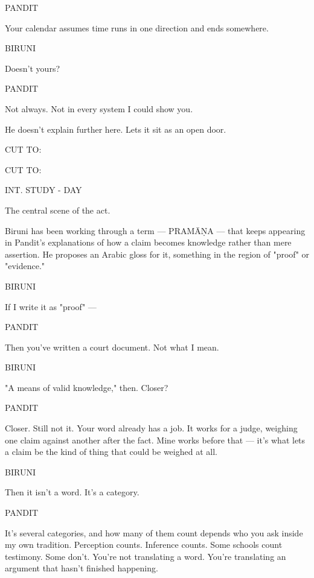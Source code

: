 \documentclass[12pt]{article}
\newcommand{\sceneheading}[1]{%
  \needspace{4\baselineskip}%
  \par\vspace{1\baselineskip}\noindent #1\par\vspace{0.6\baselineskip}%
}
\newcommand{\action}[1]{%
  \par\noindent #1\par\vspace{0.6\baselineskip}%
}
\newcommand{\transition}[1]{%
  \par\vspace{0.3\baselineskip}%
  \ifthenelse{\equal{#1}{FADE IN:}}%
    {\noindent #1\par}%
    {\noindent\hfill #1\par}%
  \vspace{0.6\baselineskip}%
}
\newcommand{\charcue}[1]{%
  \needspace{3\baselineskip}%
  \par\vspace{0.3\baselineskip}\noindent\hspace*{2.2in}#1\par%
}
\newenvironment{dialogue}{%
  \begin{list}{}{%
    \setlength{\leftmargin}{1.1in}%
    \setlength{\rightmargin}{1.6in}%
    \setlength{\listparindent}{0pt}%
    \setlength{\itemindent}{0pt}%
    \setlength{\parsep}{0pt}%
    \setlength{\itemsep}{0pt}%
    \setlength{\topsep}{0pt}%
  }\item[]%
}{%
  \end{list}\vspace{0.4\baselineskip}%
}
\begin{document}
\charcue{PANDIT}
\begin{dialogue}
Your calendar assumes time runs in one direction and ends somewhere.\\
\end{dialogue}
\charcue{BIRUNI}
\begin{dialogue}
Doesn't yours?\\
\end{dialogue}
\charcue{PANDIT}
\begin{dialogue}
Not always. Not in every system I could show you.\\
\end{dialogue}
\action{He doesn't explain further here. Lets it sit as an open door.}
\transition{CUT TO:}
\sceneheading{INT. STUDY - DAY}
\action{The central scene of the act.}
\action{Biruni has been working through a term --- PRAMĀṆA --- that keeps appearing in Pandit's explanations of how a claim becomes knowledge rather than mere assertion. He proposes an Arabic gloss for it, something in the region of "proof" or "evidence."}
\charcue{BIRUNI}
\begin{dialogue}
If I write it as "proof" ---\\
\end{dialogue}
\charcue{PANDIT}
\begin{dialogue}
Then you've written a court document. Not what I mean.\\
\end{dialogue}
\charcue{BIRUNI}
\begin{dialogue}
"A means of valid knowledge," then. Closer?\\
\end{dialogue}
\charcue{PANDIT}
\begin{dialogue}
Closer. Still not it. Your word already has a job. It works for a judge, weighing one claim against another after the fact. Mine works before that --- it's what lets a claim be the kind of thing that could be weighed at all.\\
\end{dialogue}
\charcue{BIRUNI}
\begin{dialogue}
Then it isn't a word. It's a category.\\
\end{dialogue}
\charcue{PANDIT}
\begin{dialogue}
It's several categories, and how many of them count depends who you ask inside my own tradition. Perception counts. Inference counts. Some schools count testimony. Some don't. You're not translating a word. You're translating an argument that hasn't finished happening.\\
\end{dialogue}
\end{document}
